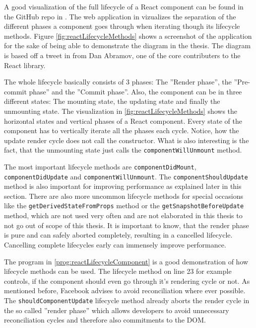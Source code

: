 A good visualization of the full lifecycle of a React component can be found in the GitHub repo in \cite{ReactRenderCycleGithub}. The web application in \cite{ReactRenderCycleDiagram} vizualizes the separation of the different phases a component goes through when iterating though its lifecycle methods. Figure \ref{fig:reactLifecycleMethods} shows a screenshot of the application for the sake of being able to demonstrate the diagram in the thesis. The diagram is based off a tweet in \cite{ReactCycleTweet} from Dan Abramov, one of the core contributers to the React library.

The whole lifecycle basically consists of 3 phases: The ''Render phase'', the ''Pre-commit phase'' and the ''Commit phase''. Also, the component can be in three different states: The mounting state, the updating state and finally the unmounting state. The visualization in \ref{fig:reactLifecycleMethods} shows the horizontal states and vertical phases of a React component. Every state of the component has to vertically iterate all the phases each cycle. Notice, how the update render cycle does not call the constructor. What is also interesting is the fact, that the unmounting state just calls the \texttt{componentWillUnmount} method.

The most important lifecycle methods are \texttt{componentDidMount}, \texttt{componentDidUpdate} and \texttt{componentWillUnmount}. The \texttt{componentShouldUpdate} method is also important for improving performance as explained later in this section. There are also more uncommon lifecycle methods for special occasions like the \texttt{getDerivedStateFromProps} method or the \texttt{getSnapshotBeforeUpdate} method, which are not used very often and are not elaborated in this thesis to not go out of scope of this thesis. It is important to know, that the render phase is pure and can safely aborted completely, resulting in a cancelled lifecycle. Cancelling complete lifecycles early can immensely improve performance.

The program in \ref{prog:reactLifecycleComponent} is a good demonstration of how lifecycle methods can be used. The lifecycle method on line 23 for example controls, if the component should even go through it's rendering cycle or not. As mentioned before, Facebook advises to avoid reconciliation where ever possible. The \texttt{shouldComponentUpdate} lifecycle method already aborts the render cycle in the so called ''render phase'' which allows developers to avoid unnecessary reconciliation cycles and therefore also commitments to the DOM. 

